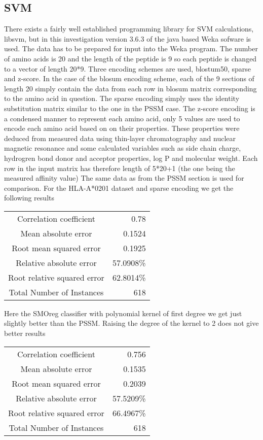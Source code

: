 \subsection{SVM}
There exists a fairly well established programming library for SVM calculations, libsvm, but in this investigation version 3.6.3 of the java based Weka sofware is used. 
The data has to be prepared for input into the Weka program. 
The number of amino acids is 20 and the length of the peptide is 9 so each peptide is changed to a vector of length 20*9. 
Three encoding schemes are used, blostum50, sparse and z-score. 
In the case of the blosum encoding scheme, each of the 9 sections of length 20 simply contain the data from each row in blosum matrix corresponding to the amino acid in question.
The sparse encoding simply uses the identity substitution matrix similar to the one in the PSSM case. 
The z-score encoding is a condensed manner to represent each amino acid, only 5 values are used to encode each amino acid based on on their properties. 
These properties were deduced from measured data using thin-layer chromatography and nuclear magnetic resonance and some calculated variables 
such as side chain charge, hydrogren bond donor and acceptor properties, log P and molecular weight. 
Each row in the input matrix has therefore length of 5*20+1 (the one being the measured affinity value)
The same data as from the PSSM section is used for comparison. For the HLA-A*0201 dataset and sparse encoding we get the following results


\begin{tabular}{ c r }
Correlation coefficient &                 0.78  \\
Mean absolute error      &                0.1524 \\
Root mean squared error   &               0.1925 \\
Relative absolute error    &             57.0908\%  \\
Root relative squared error &            62.8014\%  \\
Total Number of Instances    &          618 \\
\end{tabular}


Here the SMOreg classifier with polynomial kernel of first degree we get just slightly better than the PSSM. Raising the degree of the kernel to 2 does not give better results

\begin{tabular}{ c r }
Correlation coefficient &                 0.756 \\
Mean absolute error      &                0.1535 \\
Root mean squared error   &               0.2039 \\
Relative absolute error   &              57.5209\% \\
Root relative squared error &            66.4967\% \\
Total Number of Instances    &          618 \\
\end{tabular}

